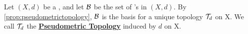 \label{def:pseudometrictopology}
\newcommand{\PseudometricTopology}[0]{\textbf{\hyperref[def:pseudometrictopology]{Pseudometric Topology}}\xspace}
\newcommand{\PseudometricInducedTopology}[0]{\textbf{\hyperref[def:pseudometrictopology]{Pseudometric Topology}}\xspace}
\begin{df}
    Let $(X,d)$ be a \PseudometricSpace, and let $\mathcal{B}$ be the set of \OpenBall's in $(X,d)$. 
    By \ref{prop:pseudometrictopology}, $\mathcal{B}$ is the basis for a unique topology $\mathcal{T}_d$ on X. 
    We call $\mathcal{T}_d$ the \PseudometricInducedTopology induced by $d$ on X. 

\end{df}
